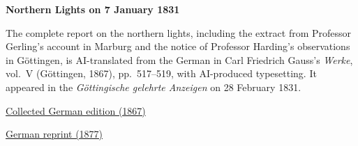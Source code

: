 \clearpage
\thispagestyle{empty}
\begin{center}\Large\textbf{Northern Lights on 7 January 1831}\end{center}

The complete report on the northern lights, including the extract from Professor Gerling’s account in Marburg and the notice of Professor Harding’s observations in Göttingen, is AI-translated from the German in Carl Friedrich Gauss’s \textit{Werke}, vol.~V (Göttingen, 1867), pp.~517--519, with AI-produced typesetting. It appeared in the \textit{Göttingische gelehrte Anzeigen} on 28 February 1831.

\medskip\noindent
\href{https://gdz.sub.uni-goettingen.de/id/PPN236006339}{Collected German edition (1867)}\par
\noindent\href{https://doi.org/10.1007/978-3-642-49319-5_27}{German reprint (1877)}
\clearpage
